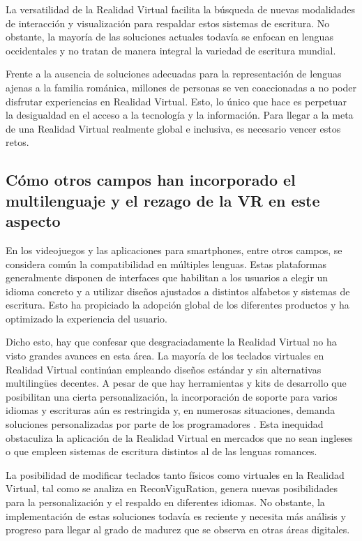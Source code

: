 La versatilidad de la Realidad Virtual facilita la búsqueda de nuevas modalidades de interacción y visualización para respaldar estos sistemas de escritura.  No obstante, la mayoría de las soluciones actuales todavía se enfocan en lenguas occidentales y no tratan de manera integral la variedad de escritura mundial.

Frente a la ausencia de soluciones adecuadas para la representación de lenguas ajenas a la familia románica, millones de personas se ven coaccionadas a no poder disfrutar experiencias en Realidad Virtual. Esto, lo único que hace es perpetuar la desigualdad en el acceso a la tecnología y la información. Para llegar a la meta de una Realidad Virtual realmente global e inclusiva, es necesario vencer estos retos. \cite{reconviguration} \cite{kat}

\subsection{Cómo otros campos han incorporado el multilenguaje y el rezago de la VR en este aspecto}

En los videojuegos y las aplicaciones para smartphones, entre otros campos, se considera común la compatibilidad en múltiples lenguas. Estas plataformas generalmente disponen de interfaces que habilitan a los usuarios a elegir un idioma concreto y a utilizar diseños ajustados a distintos alfabetos y sistemas de escritura. Esto ha propiciado la adopción global de los diferentes productos y ha optimizado la experiencia del usuario. \cite{hololingo} \cite{mdst}

Dicho esto, hay que confesar que desgraciadamente la Realidad Virtual no ha visto grandes avances en esta área. La mayoría de los teclados virtuales en Realidad Virtual continúan empleando diseños estándar y sin alternativas multilingües decentes. A pesar de que hay herramientas y kits de desarrollo que posibilitan una cierta personalización, la incorporación de soporte para varios idiomas y escrituras aún es restringida y, en numerosas situaciones, demanda soluciones personalizadas por parte de los programadores\cite{rojas2024} \cite{kat} \cite{embracing}. Esta inequidad obstaculiza la aplicación de la Realidad Virtual en mercados que no sean ingleses o que empleen sistemas de escritura distintos al de las lenguas romances.

La posibilidad de modificar teclados tanto físicos como virtuales en la Realidad Virtual, tal como se analiza en ReconViguRation, genera nuevas posibilidades para la personalización y el respaldo en diferentes idiomas. No obstante, la implementación de estas soluciones todavía es reciente y necesita más análisis y progreso para llegar al grado de madurez que se observa en otras áreas digitales. \cite{reconviguration} \cite{kat}

